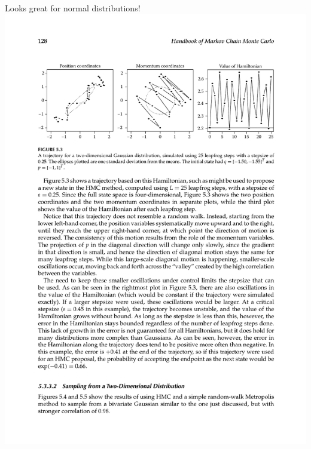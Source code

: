 \documentclass{beamer}
\begin{document}
    \begin{frame}{Looks great for normal distributions!}
        \includegraphics[width=\textwidth]{rw-vs-hmc2.pdf}
    \end{frame}
\end{document}
